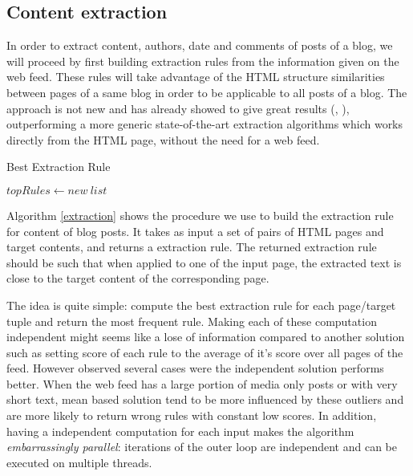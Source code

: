 \subsection{Content extraction}
In order to extract content, authors, date and comments of posts of a blog, we will proceed by first building extraction rules from the information given on the web feed. These rules will take advantage of the HTML structure similarities between pages of a same blog in order to be applicable to all posts of a blog. The approach is not new and has already showed to give great results (\cite{gkotsis2013}, \cite{oita2010}), outperforming a more generic state-of-the-art extraction algorithms which works directly from the HTML page, without the need for a web feed.

\begin{algorithm}
  \caption{Best Extraction Rule}\label{extraction}
  \thinspace
  \DontPrintSemicolon

  \BlankLine
  $topRules \longleftarrow new~list$\;
  \;
\end{algorithm}

Algorithm \ref{extraction} shows the procedure we use to build the extraction rule for content of blog posts. It takes as input a set of pairs of HTML pages and target contents, and returns a extraction rule. The returned extraction rule should be such that when applied to one of the input page, the extracted text is close to the target content of the corresponding page.

The idea is quite simple: compute the best extraction rule for each page/target tuple and return the most frequent rule. Making each of these computation independent might seems like a lose of information compared to another solution such as setting score of each rule to the average of it's score over all pages of the feed. However observed several cases were the independent solution performs better. When the web feed has a large portion of media only posts or with very short text, mean based solution tend to be more influenced by these outliers and are more likely to return wrong rules with constant low scores. In addition, having a independent computation for each input makes the algorithm \emph{embarrassingly parallel}: iterations of the outer loop are independent and can be executed on multiple threads.

